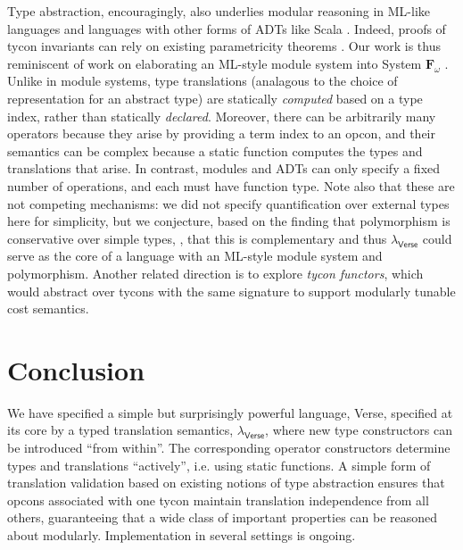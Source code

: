 \documentclass[preprint]{sigplanconf}
\newcommand{\Verse}{{\textsf{\small Verse}}}
\begin{document}
Type abstraction, encouragingly, also underlies modular reasoning in ML-like languages \cite{pfpl,harper1997programming} and languages with other forms of ADTs \cite{liskov1974programming} like Scala \cite{conf/oopsla/AminRO14}. Indeed, proofs of tycon invariants can rely on existing parametricity theorems \cite{WadlerThms}. 
Our work is thus reminiscent of  work on elaborating an ML-style module system into System $\mathbf{F}_\omega$ \cite{conf/tldi/RossbergRD10}.  Unlike in module systems, type translations (analagous to the choice of representation for an abstract type) are statically \emph{computed} based on a type index, rather than statically \emph{declared}. Moreover, there can be arbitrarily many operators because they arise by providing a term index to an opcon, and their  semantics can be complex because a static function computes the types and translations that arise. In contrast, modules and ADTs can only specify a fixed number of operations, and each must have function type. Note also that these are not competing mechanisms: we did not specify quantification over external types here for simplicity, but we conjecture, based on the finding that polymorphism is conservative over simple types, \cite{breazu1990polymorphism}, that this is  complementary and thus $\lambda_\textsf{Verse}$ could serve as the core of a language with an ML-style module system and polymorphism. Another related direction is to explore \emph{tycon functors}, which would abstract over tycons with the same signature to support modularly tunable cost semantics. %


\section{Conclusion}
\noindent We have specified a simple but surprisingly powerful language, {\Verse}, specified at its core by a typed translation semantics, $\lambda_\textsf{Verse}$, where new type constructors can be introduced ``from within''. The corresponding operator constructors determine types and translations ``actively'', i.e. using static functions. A simple form of translation validation based on existing notions of type abstraction  ensures that opcons associated with one tycon maintain translation independence from all others, guaranteeing that a wide class of important properties can be reasoned about modularly. Implementation in several settings is ongoing.
\end{document}
